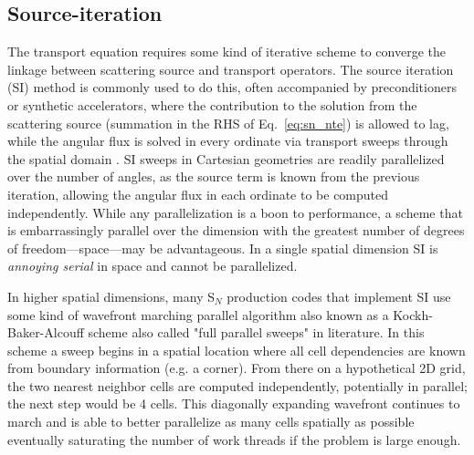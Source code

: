 \subsection{Source-iteration}
\label{sec:intro_itterative-scheme}

The transport equation requires some kind of iterative scheme to converge the linkage between scattering source and transport operators.
The source iteration (SI) method is commonly used to do this, often accompanied by preconditioners or synthetic accelerators, where the contribution to the solution from the scattering source (summation in the RHS of Eq.~\eqref{eq:sn_nte}) is allowed to lag, while the angular flux is solved in every ordinate via transport sweeps through the spatial domain \cite{adams_subcell_1997}.
SI sweeps in Cartesian geometries are readily parallelized over the number of angles, as the source term is known from the previous iteration, allowing the angular flux in each ordinate to be computed independently. 
While any parallelization is a boon to performance, a scheme that is embarrassingly parallel over the dimension with the greatest number of degrees of freedom---space---may be advantageous.
In a single spatial dimension SI is \textit{annoying serial} in space and cannot be parallelized.

In higher spatial dimensions, many S$_N$ production codes that implement SI use some kind of wavefront marching parallel algorithm also known as a Kockh-Baker-Alcouff scheme \citep{KBA} also called "full parallel sweeps" in literature.
In this scheme a sweep begins in a spatial location where all cell dependencies are known from boundary information (e.g. a corner).
From there on a hypothetical 2D grid, the two nearest neighbor cells are computed independently, potentially in parallel; the next step would be 4 cells.
This diagonally expanding wavefront continues to march and is able to better parallelize as many cells spatially as possible eventually saturating the number of work threads if the problem is large enough.

